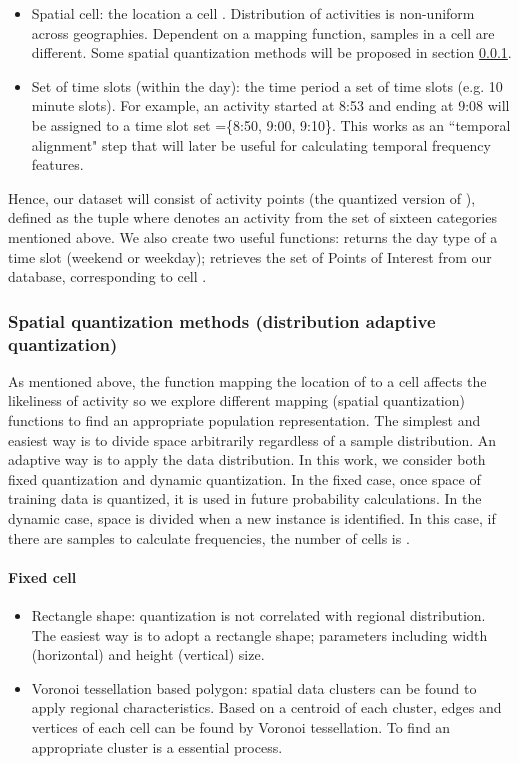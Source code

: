 \documentclass{sig-alternate}
\begin{document}
  \begin{itemize}
  \item Spatial cell: the location   a cell .
  Distribution of activities is non-uniform across geographies. Dependent on a mapping function, samples in a cell are different. Some spatial quantization methods will be proposed in section \ref{sec:spatialquantization}.


  \item Set of time slots (within the day): the time period   a set   of time slots (e.g. 10 minute slots). For example, an activity started at 8:53 and ending at 9:08 will be assigned to a time slot set  =\{8:50, 9:00, 9:10\}. This works as an ``temporal alignment" step that will later be useful for calculating temporal frequency features.
\end{itemize}

Hence, our dataset will consist of activity points  (the quantized version of ), defined as the tuple  where  denotes an activity from the set of sixteen categories mentioned above. We also create two useful functions:  returns the day type of a time slot  (weekend or weekday);  retrieves the set of Points of Interest from our database, corresponding to cell .

 \subsubsection{Spatial quantization methods (distribution adaptive quantization) } \label{sec:spatialquantization}
As mentioned above, the function mapping the location of  to a cell  affects the likeliness of activity  so we explore different mapping (spatial quantization) functions to find an appropriate population representation.
The simplest and easiest way is to divide space arbitrarily regardless of a sample distribution. An adaptive way is to apply the data distribution. In this work, we consider both fixed quantization and dynamic quantization. In the fixed case, once space of training data is quantized, it is used in future probability calculations. In the dynamic case, space is divided when a new instance is identified. In this case, if there are  samples to calculate frequencies, the number of cells is .

\paragraph{Fixed cell}
\begin{itemize}
\item Rectangle shape: quantization is not correlated with regional distribution. The easiest way is to adopt a rectangle shape; parameters including width (horizontal) and height (vertical) size.
\item Voronoi tessellation based polygon: spatial data clusters can be found to apply regional characteristics. Based on a centroid of each cluster, edges and vertices of each cell can be found by Voronoi tessellation. To find an appropriate cluster is a essential process.

\end{itemize}
\end{document}
